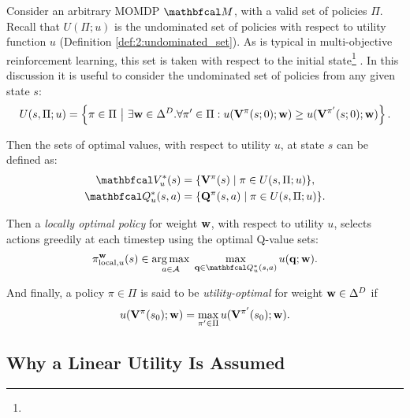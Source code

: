     Consider an arbitrary MOMDP $\bfcl{M}$, with a valid set of policies $\Pi$. Recall that $U(\Pi;u)$ is the undominated set of policies with respect to utility function $u$ (Definition \ref{def:2:undominated_set}). As is typical in multi-objective reinforcement learning, this set is taken with respect to the initial state\footnote{} \cite{morl_survey}. In this discussion it is useful to consider the undominated set of policies from any given state $s$:
    \begin{align}
        U(s,\Pi;u) = \left\{\pi\in\Pi\ \big|\ \exists \mathbf{w}\in\Delta^D. \forall \pi'\in\Pi: u(\mathbf{V}^{\pi}(s;0);\mathbf{w}) \geq u(\mathbf{V}^{\pi'}(s;0);\mathbf{w}) \right\}. \label{eq:5:undominated_set_def}
    \end{align}

    Then the sets of optimal values, with respect to utility $u$, at state $s$ can be defined as:
    \begin{align}
        \bfcl{V}^*_u(s) &= \{\bff{V}^{\pi}(s) \mid \pi \in U(s,\Pi;u)\}, \\
        \bfcl{Q}^*_u(s, a) &= \{\bff{Q}^{\pi}(s, a) \mid \pi \in U(s,\Pi;u)\}.
    \end{align}
    
    Then a \textit{locally optimal policy} for weight $\mathbf{w}$, with respect to utility $u$, selects actions greedily at each timestep using the optimal Q-value sets:
    \begin{align}
        \pi^{\bff{w}}_{\text{local},u}(s) \in \argmax_{a \in \cl{A}}\;
            \max_{\bff{q} \in \bfcl{Q}^*_u(s, a)} u(\bff{q}; \bff{w}).
            \label{eq:5:locally_optimal_policy}
    \end{align}

    And finally, a policy $\pi\in\Pi$ is said to be \textit{utility-optimal} for weight $\mathbf{w}\in\Delta^D$ if
    \begin{align}
        u(\mathbf{V}^{\pi}(s_0); \mathbf{w}) = \max_{\pi'\in\Pi} u(\mathbf{V}^{\pi'}(s_0); \mathbf{w}). \label{eq:5:utility_optimal}
    \end{align}




\subsection{Why a Linear Utility Is Assumed}
\label{sec:5-6-2-linear_utility}

